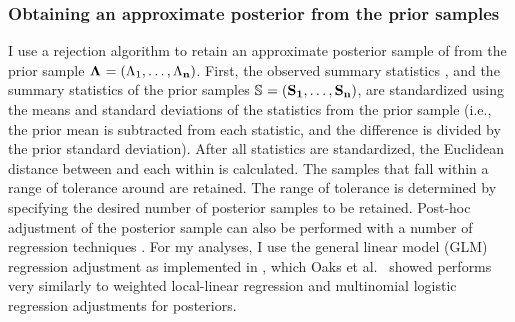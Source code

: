 \subsubsection{Obtaining an approximate posterior from the prior samples}
I use a rejection algorithm to retain an approximate posterior sample of
\paramSampleVector{} from the prior sample
$\boldsymbol{\Lambda_{}} = (\Lambda_{1}, \ldots, \Lambda_{\mathbf{n}})$.
First, the observed summary statistics \ssVectorObs, and the summary statistics
of the prior samples 
$\ssMatrix = (\ssVector{1}, \ldots, \ssVector{\numPriorSamples})$,
are standardized using the means and standard deviations of the statistics from
the prior sample (i.e., the prior mean is subtracted from each statistic, and the
difference is divided by the prior standard deviation).
After all statistics are standardized, the Euclidean distance between
\ssVectorObs and each \ssVector{} within \ssMatrix is calculated.
The samples that fall within a range of tolerance \tol around \ssVectorObs
are retained.
The range of tolerance is determined by specifying the desired number of
posterior samples to be retained.
Post-hoc adjustment of the posterior sample can also be performed with a number
of regression techniques \cite{Beaumont2002,Blum2009,Leuenberger2010}.
For my analyses, I use the general linear model (GLM) regression adjustment
\cite{Leuenberger2010} as implemented in \abctoolbox
\cite[v1.1;]{ABCtoolbox}, which Oaks et al.\ \cite{Oaks2012} showed performs
very similarly to weighted local-linear regression and multinomial logistic
regression adjustments \cite{Beaumont2002} for \msb posteriors.


